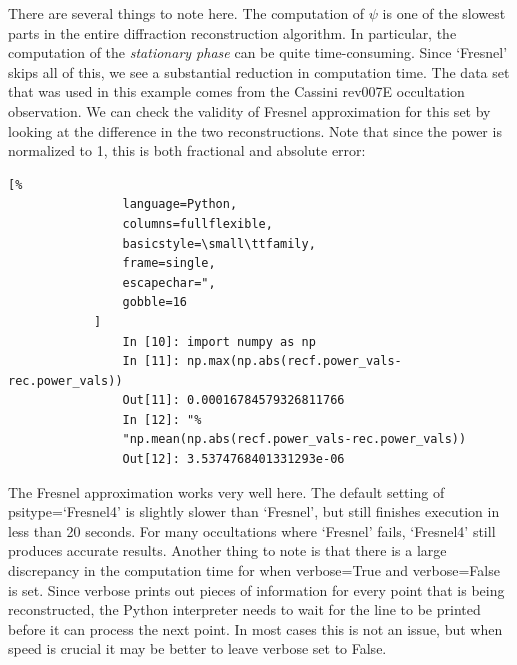 \documentclass[titlepage, 12pt]{article}
\begin{document}
            \par\hfill\par
            There are several things to note here.
            The computation of $\psi$ is one of the slowest
            parts in the entire diffraction reconstruction
            algorithm. In particular, the computation of the
            \textit{stationary phase} can be quite time-consuming.
            Since `Fresnel' skips all of this, we see a
            substantial reduction in computation time. The data
            set that was used in this example comes from
            the Cassini rev007E occultation observation. We
            can check the validity of Fresnel approximation
            for this set by looking at the difference in the
            two reconstructions. Note that since the power
            is normalized to 1, this is both fractional and
            absolute error:
            \par\hfill\par
            \begin{lstlisting}[%
                language=Python,
                columns=fullflexible,
                basicstyle=\small\ttfamily,
                frame=single,
                escapechar=",
                gobble=16
            ]
                In [10]: import numpy as np
                In [11]: np.max(np.abs(recf.power_vals-rec.power_vals))
                Out[11]: 0.00016784579326811766
                In [12]: "%
                "np.mean(np.abs(recf.power_vals-rec.power_vals))
                Out[12]: 3.5374768401331293e-06
            \end{lstlisting}
            The Fresnel approximation works very well here.
            The default setting of psitype=`Fresnel4'
            is slightly slower than `Fresnel', but still finishes execution
            in less than 20 seconds. For many occultations where
            `Fresnel' fails, `Fresnel4' still produces accurate results.
            Another thing to note is that there is a large
            discrepancy in the computation time for when
            verbose=True and verbose=False is set.
            Since verbose prints out pieces of information for
            every point that is being reconstructed, the
            Python interpreter needs to wait for the line
            to be printed before it can process the next point.
            In most cases this is not an issue, but when speed
            is crucial it may be better to leave verbose set
            to False.
\end{document}
